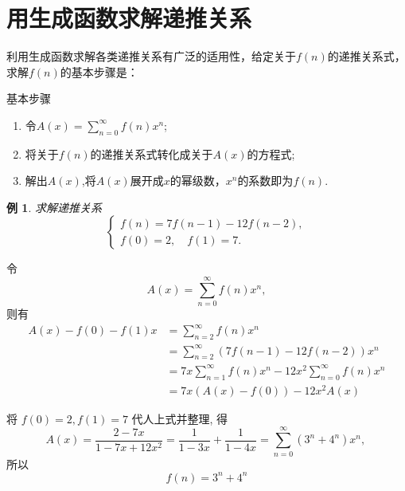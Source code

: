 \documentclass[punct]{ctexbeamer}
\newtheorem{ex}{例}[section]
\def\sol{\noindent {\bf 解\ }}
\begin{document}
\section{用生成函数求解递推关系}
\begin{frame}
	利用生成函数求解各类递推关系有广泛的适用性，给定关于$f(n)$的递推关系式，求解$f(n)$的基本步骤是：
		\begin{block}{基本步骤}
		\begin{enumerate}
			\item 令$A(x)=\sum_{n=0}^{\infty}f(n)x^{n}$;
			\item 将关于$f(n)$的递推关系式转化成关于$A(x)$的方程式;
			\item 解出$A(x)$,将$A(x)$展开成$x$的幂级数，$x^{n}$的系数即为$f(n)$.
		\end{enumerate}

	\end{block}
\end{frame}

\begin{frame}
\begin{ex}
			求解递推关系
			\[
			\left\{\begin{array}{l}
				f(n)=7f(n-1)-12f(n-2), \\
				f(0)=2,\quad f(1)=7 .
			\end{array}\right.\tag{6.4.3}
			\]
		\end{ex}
		\pause\sol
令$$A(x)=\sum_{n=0}^{\infty}f(n)x^{n},$$ 则有$$
\begin{aligned}
	A(x)-f(0)-f(1) x &=\sum_{n=2}^{\infty} f(n) x^n \\
	&=\sum_{n=2}^{\infty} \left( 7 f(n-1)-12 f(n-2) \right)  x^n \\
	&=7 x \sum_{n=1}^{\infty} f(n) x^n-12 x^2 \sum_{n=0}^{\infty} f(n) x^n \\
	&=7 x \left( A(x)-f(0) \right) -12 x^2 A(x)
\end{aligned}
$$
\end{frame}

\begin{frame}
	将 $f(0)=2, f(1)=7$ 代人上式并整理, 得
	$$
	A(x)=\frac{2-7 x}{1-7 x+12 x^2}=\frac{1}{1-3 x}+\frac{1}{1-4 x}=\sum_{n=0}^{\infty}\left(3^n+4^n\right) x^n \text {, }
	$$
	所以
	$$
	f(n)=3^n+4^n
	$$
\end{frame}
\end{document}

